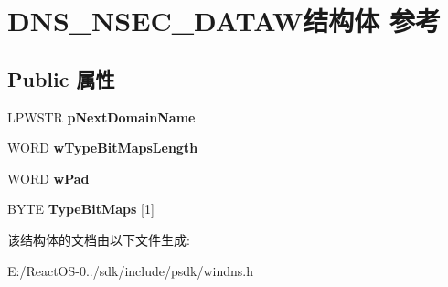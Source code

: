 \hypertarget{struct_d_n_s___n_s_e_c___d_a_t_a_w}{}\section{D\+N\+S\+\_\+\+N\+S\+E\+C\+\_\+\+D\+A\+T\+A\+W结构体 参考}
\label{struct_d_n_s___n_s_e_c___d_a_t_a_w}
\subsection*{Public 属性}
\begin{DoxyCompactItemize}
\item 
\mbox{\label{struct_d_n_s___n_s_e_c___d_a_t_a_w_afcd434a8367981bdbd2ea10630305984}} 
L\+P\+W\+S\+TR {\bfseries p\+Next\+Domain\+Name}
\item 
\mbox{\label{struct_d_n_s___n_s_e_c___d_a_t_a_w_a0d4accfe70afb8a4fed0a74e7f1492e1}} 
W\+O\+RD {\bfseries w\+Type\+Bit\+Maps\+Length}
\item 
\mbox{\label{struct_d_n_s___n_s_e_c___d_a_t_a_w_a7e451799c36438bc5d91bfd858b0a119}} 
W\+O\+RD {\bfseries w\+Pad}
\item 
\mbox{\label{struct_d_n_s___n_s_e_c___d_a_t_a_w_a47c081e73d10445931e87ad1d001d3ea}} 
B\+Y\+TE {\bfseries Type\+Bit\+Maps} \mbox{[}1\mbox{]}
\end{DoxyCompactItemize}


该结构体的文档由以下文件生成\+:\begin{DoxyCompactItemize}
\item 
E\+:/\+React\+O\+S-\/0../sdk/include/psdk/windns.\+h\end{DoxyCompactItemize}
